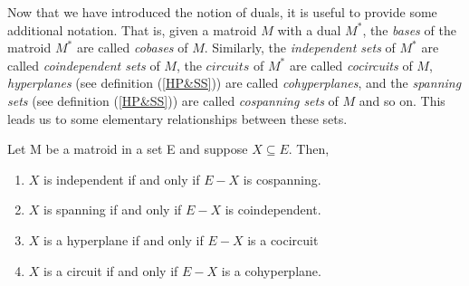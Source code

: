 Now that we have introduced the notion of duals, it is useful to provide some additional notation. That is, given a matroid $M$ with a dual $M^*$, the \textit{bases} of the matroid $M^*$ are called \textit{cobases} of $M$. Similarly, the \textit{independent sets} of $M^*$ are called \textit{coindependent sets} of $M$, the $circuits$ of $M^*$ are called \textit{cocircuits} of $M$, \textit{hyperplanes} (see definition (\ref{HP&SS})) are called \textit{cohyperplanes}, and the \textit{spanning sets} (see definition (\ref{HP&SS})) are called \textit{cospanning sets} of $M$ and so on. This leads us to some elementary relationships between these sets. 

\begin{theorem}\label{propositionsofdualrelations}
    Let M be a matroid in a set E and suppose $X \subseteq E$. Then,
    \begin{enumerate}
        \item $X$ is independent if and only if $E-X$ is cospanning.
        \item $X$ is spanning if and only if $E-X$ is coindependent.
        \item $X$ is a hyperplane if and only if $E-X$ is a cocircuit
        \item $X$ is a circuit if and only if $E-X$ is a cohyperplane.
    \end{enumerate}
\end{theorem} 

